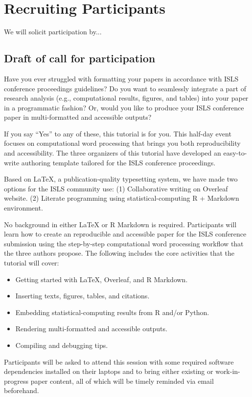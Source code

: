 \documentclass{article}
\begin{document}
\section{Recruiting Participants}
We will solicit participation by...
\subsection{Draft of call for participation }

Have you ever struggled with formatting your papers in accordance with ISLS conference proceedings guidelines? Do you want to seamlessly integrate a part of research analysis (e.g., computational results, figures, and tables) into your paper in a programmatic fashion? Or, would you like to produce your ISLS conference paper in multi-formatted and accessible outputs?

If you say “Yes” to any of these, this tutorial is for you. This half-day event focuses on computational word processing that brings you both reproducibility and accessibility. The three organizers of this tutorial have developed an easy-to-write authoring template tailored for the ISLS conference proceedings.

Based on LaTeX, a publication-quality typesetting system, we have made two options for the ISLS community use: (1) Collaborative writing on Overleaf website. (2) Literate programming using statistical-computing R + Markdown environment.

No background in either LaTeX or R Markdown is required. Participants will learn how to create an reproducible and accessible paper for the ISLS conference submission using the step-by-step computational word processing workflow that the three authors propose. The following includes the core activities that the tutorial will cover:

\begin{itemize}
  \item Getting started with LaTeX, Overleaf, and R Markdown.
  \item Inserting texts, figures, tables, and citations.
  \item Embedding statistical-computing results from R and/or Python.
  \item Rendering multi-formatted and accessible outputs.
  \item Compiling and debugging tips.
\end{itemize}

Participants will be asked to attend this session with some required software dependencies installed on their laptops and to bring either existing or work-in-progress paper content, all of which will be timely reminded via email beforehand.
\end{document}
